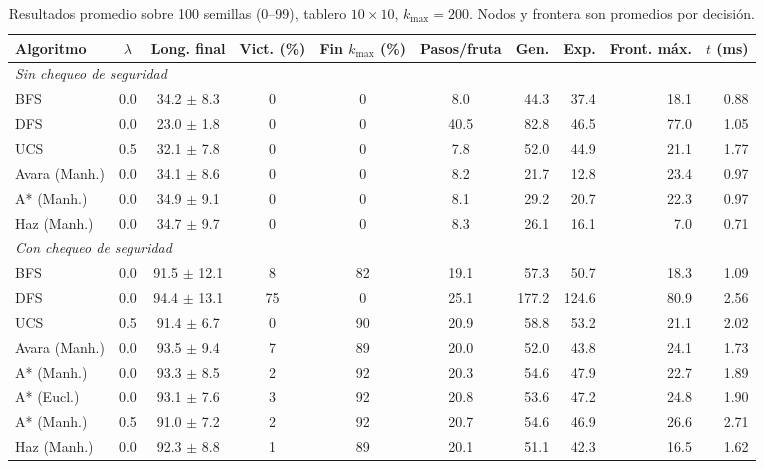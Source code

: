 \begin{table}[!htb]
\centering
\footnotesize
\setlength{\tabcolsep}{4pt}
\caption{Resultados promedio sobre 100 semillas (0--99), tablero $10\times10$, $k_{\max}=200$. Nodos y frontera son promedios por decisión.}
\label{tab:resultados}
\begin{tabular}{lcccccrrrr}
\toprule
Algoritmo & $\lambda$ & Long. final & Vict. (\%) & Fin $k_{\max}$ (\%) & Pasos/fruta & Gen. & Exp. & Front. máx. & $t$ (ms)\\
\midrule
\multicolumn{10}{l}{\textit{Sin chequeo de seguridad}}\\
BFS & 0.0 & 34.2 $\pm$ 8.3 & 0 & 0 & 8.0 & 44.3 & 37.4 & 18.1 & 0.88\\
DFS & 0.0 & 23.0 $\pm$ 1.8 & 0 & 0 & 40.5 & 82.8 & 46.5 & 77.0 & 1.05\\
UCS & 0.5 & 32.1 $\pm$ 7.8 & 0 & 0 & 7.8 & 52.0 & 44.9 & 21.1 & 1.77\\
Avara (Manh.) & 0.0 & 34.1 $\pm$ 8.6 & 0 & 0 & 8.2 & 21.7 & 12.8 & 23.4 & 0.97\\
A* (Manh.) & 0.0 & 34.9 $\pm$ 9.1 & 0 & 0 & 8.1 & 29.2 & 20.7 & 22.3 & 0.97\\
Haz (Manh.) & 0.0 & 34.7 $\pm$ 9.7 & 0 & 0 & 8.3 & 26.1 & 16.1 & 7.0 & 0.71\\
\midrule
\multicolumn{10}{l}{\textit{Con chequeo de seguridad}}\\
BFS & 0.0 & 91.5 $\pm$ 12.1 & 8 & 82 & 19.1 & 57.3 & 50.7 & 18.3 & 1.09\\
DFS & 0.0 & 94.4 $\pm$ 13.1 & 75 & 0 & 25.1 & 177.2 & 124.6 & 80.9 & 2.56\\
UCS & 0.5 & 91.4 $\pm$ 6.7 & 0 & 90 & 20.9 & 58.8 & 53.2 & 21.1 & 2.02\\
Avara (Manh.) & 0.0 & 93.5 $\pm$ 9.4 & 7 & 89 & 20.0 & 52.0 & 43.8 & 24.1 & 1.73\\
A* (Manh.) & 0.0 & 93.3 $\pm$ 8.5 & 2 & 92 & 20.3 & 54.6 & 47.9 & 22.7 & 1.89\\
A* (Eucl.) & 0.0 & 93.1 $\pm$ 7.6 & 3 & 92 & 20.8 & 53.6 & 47.2 & 24.8 & 1.90\\
A* (Manh.) & 0.5 & 91.0 $\pm$ 7.2 & 2 & 92 & 20.7 & 54.6 & 46.9 & 26.6 & 2.71\\
Haz (Manh.) & 0.0 & 92.3 $\pm$ 8.8 & 1 & 89 & 20.1 & 51.1 & 42.3 & 16.5 & 1.62\\
\bottomrule
\end{tabular}
\end{table}
